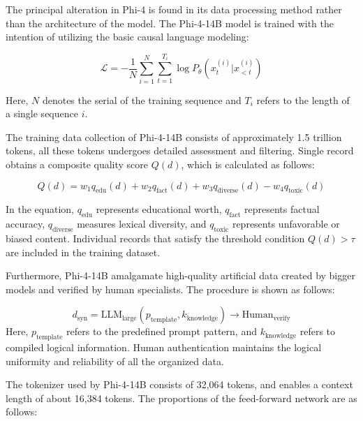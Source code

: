 \documentclass[10pt,letterpaper]{article}
\begin{document}
The principal alteration in Phi-4 is found in its data processing method rather than the architecture of the model. The Phi-4-14B model is trained with the intention of utilizing the basic causal language modeling:

\begin{equation}
\mathcal{L} = -\frac{1}{N}\sum_{i=1}^{N}\sum_{t=1}^{T_i} \log P_\theta(x_t^{(i)} | x_{<t}^{(i)})
\label{eq:phi_loss}
\end{equation}

Here, \( N \) denotes the serial of the training sequence and \( T_i \) refers to the length of a single sequence \( i \).

The training data collection of Phi-4-14B consists of approximately 1.5 trillion tokens, all these tokens undergoes detailed assessment and filtering. Single record obtains a composite quality score \( Q(d) \), which is calculated as follows:

\begin{equation}
Q(d) = w_1 q_{\text{edu}}(d) + w_2 q_{\text{fact}}(d) + w_3 q_{\text{diverse}}(d) - w_4 q_{\text{toxic}}(d)
\label{eq:quality}
\end{equation}

In the equation, \( q_{\text{edu}} \) represents educational worth, \( q_{\text{fact}} \) represents factual accuracy, \( q_{\text{diverse}} \) measures lexical diversity, and \( q_{\text{toxic}} \) represents unfavorable or biased content. Individual records that satisfy the threshold condition \( Q(d) > \tau \) are included in the training dataset.

Furthermore, Phi-4-14B amalgamate high-quality artificial data created by bigger models and verified by human specialists. The procedure is shown as follows:

\begin{equation}
d_{\text{syn}} = \text{LLM}_{\text{large}}(p_{\text{template}}, k_{\text{knowledge}}) \rightarrow \text{Human}_{\text{verify}}
\label{eq:synthetic}
\end{equation}
Here, \( p_{\text{template}} \) refers to the predefined prompt pattern, and \( k_{\text{knowledge}} \) refers to compiled logical information. Human authentication maintains the logical uniformity and reliability of all the organized data.

The tokenizer used by Phi-4-14B consists of 32,064 tokens, and enables a context length of about 16,384 tokens. The proportions of the feed-forward network are as follows:
\end{document}
